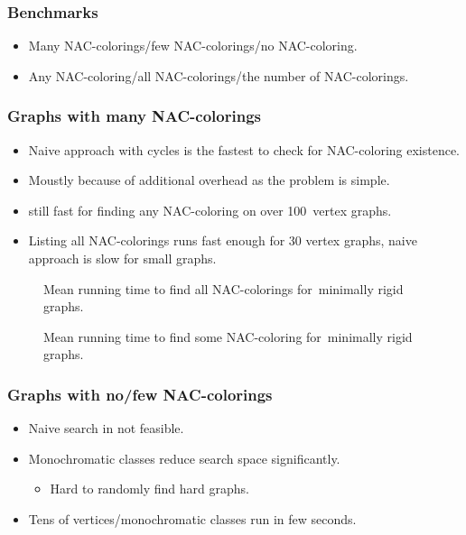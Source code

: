 \documentclass[aspectratio=\myaspectratio]{beamer}
\newcommand{\BenchFigureScale}{0.42}
\begin{document}
\begin{frame}
	\frametitle{Benchmarks}
	\begin{itemize}
		\item
		      Many NAC-colorings/few NAC-colorings/no NAC-coloring.
		\item
		      Any NAC-coloring/all NAC-colorings/the number of NAC-colorings.
	\end{itemize}
\end{frame}

\begin{frame}
	\frametitle{Graphs with many NAC-colorings}
	\begin{itemize}
		\item
		      Naive approach with cycles is the fastest to check for NAC-coloring existence.
		\item
		      Moustly because of additional overhead as the problem is simple.
		\item
		      \Subgraphs{} still fast for finding any NAC-coloring on over 100 vertex graphs.
		\item
		      Listing all NAC-colorings runs fast enough for 30 vertex graphs,
		      naive approach is slow for small graphs.
	\end{itemize}
\end{frame}

\begin{frame}

	\begin{figure}[ht]
		\centering
		\scalebox{\BenchFigureScale}{}
		\caption[Running time for~minimally rigid graphs]{
			Mean running time to find all NAC-colorings for~minimally rigid graphs.}%
	\end{figure}%

	\begin{figure}[thbp]
		\centering
		\scalebox{\BenchFigureScale}{}
		\caption[Mean runtime for~minimally rigid graphs (some)]{
			Mean running time to find some NAC-coloring for~minimally rigid graphs.}%
	\end{figure}%
\end{frame}

\begin{frame}
	\frametitle{Graphs with no/few NAC-colorings}
	\begin{itemize}
		\item
		      Naive search in not feasible.
		\item
		      Monochromatic classes reduce search space significantly.
		      \begin{itemize}
			      \item Hard to randomly find hard graphs.
		      \end{itemize}
		\item
		      Tens of vertices/monochromatic classes run in few seconds.
	\end{itemize}
\end{frame}
\end{document}
